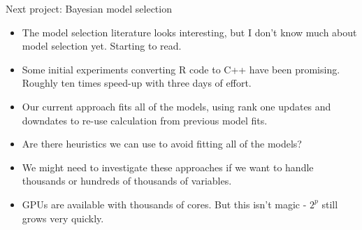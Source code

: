 \documentclass{beamer}
\begin{document}
\begin{frame}{Next project: Bayesian model selection}
\begin{itemize}
\item The model selection literature looks interesting, but I don't know much about model selection yet.
			Starting to read.
\item Some initial experiments converting R code to C++ have been promising. Roughly ten times speed-up
			with three days of effort.
\item Our current approach fits all of the models, using rank one updates and
			downdates to re-use calculation from previous model fits.
\item Are there heuristics we can use to avoid fitting all of the models?
\item We might need to investigate these approaches if we want to handle thousands or hundreds of thousands
			of variables.
\item GPUs are available with thousands of cores. But this isn't magic - $2^p$ still grows very quickly.
\end{itemize}
\end{frame}
\end{document}
